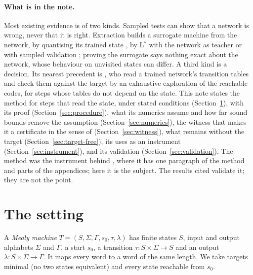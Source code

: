 \documentclass[11pt]{article}
\theoremstyle{definition}
\begin{document}
\paragraph{What is in the note.} Most existing evidence is of two kinds. Sampled tests can show that a
network is wrong, never that it is right. Extraction builds a surrogate machine from the network, by
quantising its trained state
\citep{giles-1992-learning-extracting-fsa-second-order-rnn,omlin-1996-extraction-rules-discrete-time-rnn},
by L$^\ast$ with the network as teacher \citep{weiss-2018-extracting-automata-queries-counterexamples}
or with sampled validation \citep{mayr-2018-regular-inference-artificial-neural-networks}; proving the
surrogate says nothing exact about the network, whose behaviour on unvisited states can differ. A third
kind is a decision. Its nearest precedent is \citet{brandoit-2026-length-independent-state-tracking}, who
read a trained network's transition tables and check them against the target by an exhaustive
exploration of the reachable codes, for steps whose tables do not depend on the state. This note states
the method for steps that read the state, under stated conditions (Section~\ref{sec:setting}), with its
proof (Section~\ref{sec:procedure}), what its numerics assume and how far sound bounds remove the
assumption (Section~\ref{sec:numerics}), the witness that makes it a certificate in the sense of
\citet{mcconnell-2011-certifying-algorithms} (Section~\ref{sec:witness}), what remains without the target
(Section~\ref{sec:target-free}), its uses as an instrument (Section~\ref{sec:instrument}), and its
validation (Section~\ref{sec:validation}). The method was the instrument behind
\citet{barkhuizen-2026-learning-transducers-with-proof}, where it has one paragraph of the method and
parts of the appendices; here it is the subject. The results cited validate it; they are not the point.

\section{The setting}
\label{sec:setting}

A \emph{Mealy machine} $T = (S, \Sigma, \Gamma, s_0, \tau, \lambda)$ has finite states $S$, input and
output alphabets $\Sigma$ and $\Gamma$, a start $s_0$, a transition $\tau : S \times \Sigma \to S$ and an
output $\lambda : S \times \Sigma \to \Gamma$. It maps every word to a word of the same length. We take
targets minimal (no two states equivalent) and every state reachable from $s_0$.
\end{document}
